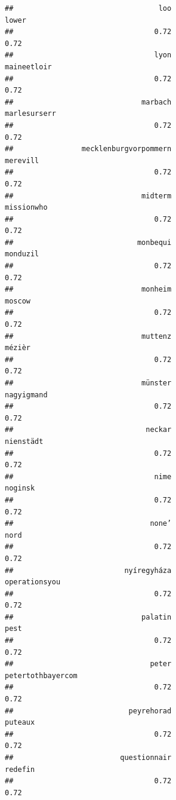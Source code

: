 \documentclass[
]{article}
\begin{document}
\begin{verbatim}
##                                  loo                                lower 
##                                 0.72                                 0.72 
##                                 lyon                          maineetloir 
##                                 0.72                                 0.72 
##                              marbach                         marlesurserr 
##                                 0.72                                 0.72 
##                mecklenburgvorpommern                             merevill 
##                                 0.72                                 0.72 
##                              midterm                           missionwho 
##                                 0.72                                 0.72 
##                             monbequi                             monduzil 
##                                 0.72                                 0.72 
##                              monheim                               moscow 
##                                 0.72                                 0.72 
##                              muttenz                               mézièr 
##                                 0.72                                 0.72 
##                              münster                           nagyigmand 
##                                 0.72                                 0.72 
##                               neckar                            nienstädt 
##                                 0.72                                 0.72 
##                                 nime                              noginsk 
##                                 0.72                                 0.72 
##                                none’                                 nord 
##                                 0.72                                 0.72 
##                          nyíregyháza                        operationsyou 
##                                 0.72                                 0.72 
##                              palatin                                 pest 
##                                 0.72                                 0.72 
##                                peter                    petertothbayercom 
##                                 0.72                                 0.72 
##                           peyrehorad                              puteaux 
##                                 0.72                                 0.72 
##                         questionnair                              redefin 
##                                 0.72                                 0.72 

\end{verbatim}
\end{document}
